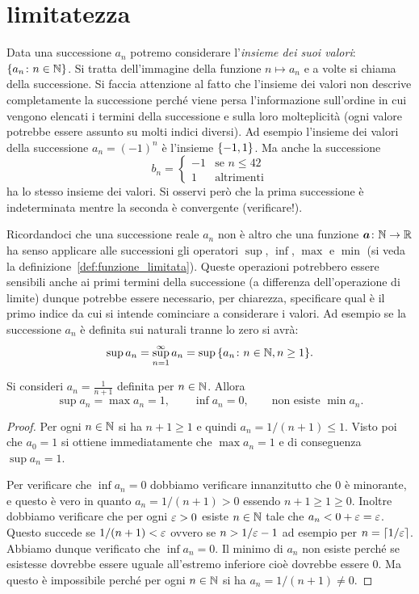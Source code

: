 \section{limitatezza}

Data una successione $a_n$ potremo considerare l'\emph{insieme
dei suoi valori}: ${\left\{ a_n\colon n\in \mathbb N \right\}}$.
Si tratta dell'immagine della funzione $n\mapsto a_n$
e a volte si chiama  della successione.
Si faccia attenzione al fatto che l'insieme dei valori
non descrive completamente la successione perché
viene persa l'informazione sull'ordine in cui vengono elencati
i termini della successione e sulla loro molteplicità (ogni valore
potrebbe essere assunto su molti indici diversi). Ad esempio
l'insieme dei valori della successione $a_n = (-1)^n$ è l'insieme ${\left\{ -1, 1 \right\}}$. Ma anche la successione
\[
 b_n = \begin{cases}
   -1 & \text{se $n\le 42$}\\
   1  & \text{altrimenti}
 \end{cases}
\]
ha lo stesso insieme dei valori.
Si osservi però
che la prima successione è indeterminata
mentre la seconda è convergente (verificare!).

Ricordandoci che una successione reale $a_n$ non è altro che
una funzione $\boldsymbol a \colon \mathbb N \to \mathbb R$
ha senso applicare alle successioni gli operatori
$\sup$, $\inf$, $\max$ e $\min$
(si veda la definizione~\ref{def:funzione_limitata}).
Queste operazioni potrebbero essere sensibili anche ai primi termini della
successione (a differenza dell'operazione di limite) dunque potrebbe
essere necessario, per chiarezza, specificare qual è il primo indice
da cui si intende cominciare a considerare i valori. Ad esempio
se la successione $a_n$ è definita sui naturali tranne lo zero
si avrà:
\[
  \sup a_n = \sup_{n=1}^\infty a_n = \sup{\left\{ a_n \colon n \in \mathbb N, n \ge 1 \right\}}.
\]

\begin{example}
Si consideri $a_n = \frac{1}{n+1}$ definita per $n\in \mathbb N$.
Allora
\[
  \sup a_n = \max a_n = 1, \qquad
  \inf a_n = 0, \qquad \text{non esiste }\min a_n.
\]
\end{example}
\begin{proof}
Per ogni $n \in \mathbb N$ si ha $n+1\ge 1$ e quindi $a_n = 1/(n+1) \le 1$.
Visto poi che $a_0 = 1$ si ottiene immediatamente che $\max a_n = 1$
e di conseguenza $\sup a_n = 1$.

Per verificare che $\inf a_n = 0$ dobbiamo verificare innanzitutto
che $0$ è minorante, e questo è vero in quanto $a_n = 1/(n+1)> 0$ essendo $n+1\ge 1 \ge 0$.
Inoltre dobbiamo verificare che per ogni $\varepsilon >0$ esiste $n\in \mathbb N$ tale
che $a_n < 0 + \varepsilon = \varepsilon$. Questo succede se $1/(n+1) < \varepsilon$ ovvero
se $n > 1/\varepsilon -1$ ad esempio per $n=\lceil 1/\varepsilon\rceil$.
Abbiamo dunque verificato che $\inf a_n = 0$.
Il minimo di $a_n$ non esiste perché se esistesse dovrebbe essere uguale
all'estremo inferiore cioè dovrebbe essere $0$. Ma questo è impossibile
perché per ogni $n\in \mathbb N$ si ha $a_n = 1/(n+1)\neq 0$.
\end{proof}

